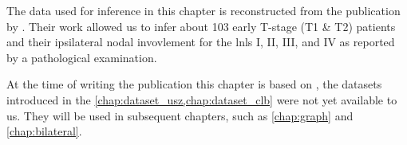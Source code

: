 \begin{tcolorbox}[
    title=\faIcon{database} Data,
    parbox=false,
    float
]
    The data used for inference in this chapter is reconstructed from the publication by . Their work allowed us to infer about 103 early T-stage (T1 \& T2) patients and their ipsilateral nodal invovlement for the \glspl{lnl} I, II, III, and IV as reported by a pathological examination.

    At the time of writing the publication this chapter is based on \cite{ludwig_hidden_2021}, the datasets introduced in the \cref{chap:dataset_usz,chap:dataset_clb} were not yet available to us. They will be used in subsequent chapters, such as \cref{chap:graph} and \cref{chap:bilateral}.
\end{tcolorbox}
